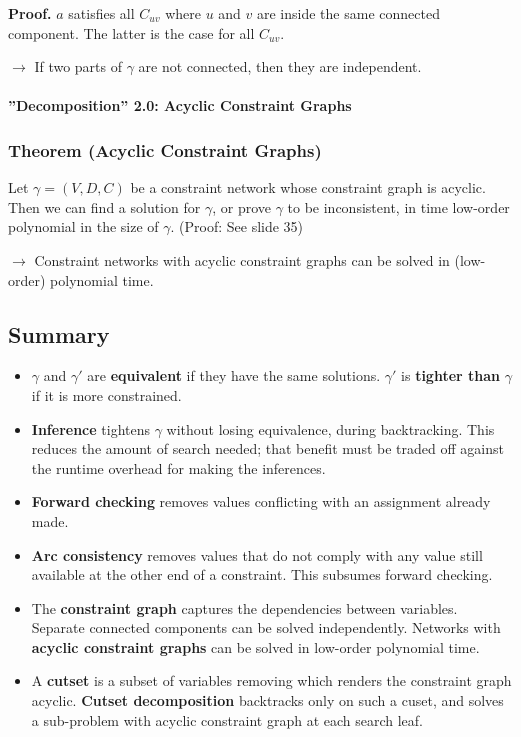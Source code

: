 \documentclass[conference]{styles/acmsiggraph}
\newcommand\subsubsubsection{\paragraph}
\begin{document}
                \textbf{Proof.}
                $a$ satisfies all $C_{uv}$ where $u$ and $v$ are inside the same connected component.
                The latter is the case for all $C_{uv}$.\newline
                
                $\rightarrow$ If two parts of $\gamma$ are not connected, then they are independent.
        
        \subsubsubsection{''Decomposition'' 2.0: Acyclic Constraint Graphs}
            \subsubsection{Theorem (Acyclic Constraint Graphs)}
                Let $\gamma = (V,D,C)$ be a constraint network whose constraint graph is acyclic.
                Then we can find a solution for $\gamma$, or prove $\gamma$ to be inconsistent, in time low-order polynomial in the size of $\gamma$. (Proof: See slide 35)\newline
                
                $\rightarrow$ Constraint networks with acyclic constraint graphs can be solved in (low-order) polynomial time.
    
    \subsection{Summary}
        \begin{itemize}
            \item $\gamma$ and $\gamma'$ are \textbf{equivalent} if they have the same solutions.
            $\gamma'$ is \textbf{tighter than} $\gamma$ if it is more constrained.
            \item \textbf{Inference} tightens $\gamma$ without losing equivalence, during backtracking.
            This reduces the amount of search needed; that benefit must be traded off against the runtime overhead for making the inferences.
            \item \textbf{Forward checking} removes values conflicting with an assignment already made.
            \item \textbf{Arc consistency} removes values that do not comply with any value still available at the other end of a constraint.
            This subsumes forward checking.
            \item The \textbf{constraint graph} captures the dependencies between variables.
            Separate connected components can be solved independently.
            Networks with \textbf{acyclic constraint graphs} can be solved in low-order polynomial time.
            \item A \textbf{cutset} is a subset of variables removing which renders the constraint graph acyclic.
            \textbf{Cutset decomposition} backtracks only on such a cuset, and solves a sub-problem with acyclic constraint graph at each search leaf.
        \end{itemize}
        
\end{document}
